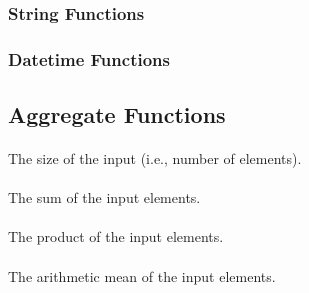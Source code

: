\paragraph{}

\subsubsection{String Functions}


\subsubsection{Datetime Functions}


\subsection{Aggregate Functions}

\paragraph{}

The size of the input (i.e., number of elements).

\paragraph{}

The sum of the input elements.

\paragraph{}

The product of the input elements.

\paragraph{}

The arithmetic mean of the input elements.

\paragraph{}

